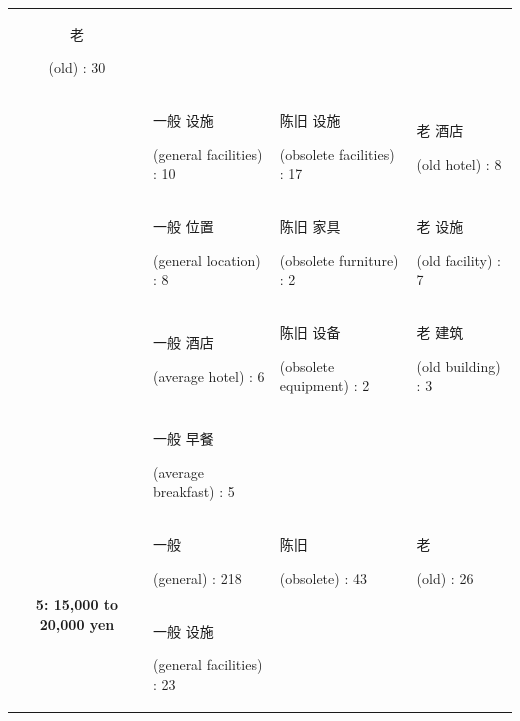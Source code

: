\documentclass[smallextended,natbib]{svjour3}       %
\begin{document}
\begin{landscape}
\begin{table}[p]
{\begin{tabular}{|c|l|l|l|}
          \begin{CJK}{UTF8}{gbsn}老\end{CJK} (old) : 30 \\
         &
          \begin{CJK}{UTF8}{gbsn}一般 设施\end{CJK} (general facilities) : 10 &
          \begin{CJK}{UTF8}{gbsn}陈旧 设施\end{CJK} (obsolete facilities) : 17 &
          \begin{CJK}{UTF8}{gbsn}老 酒店\end{CJK} (old hotel) : 8 \\
         &
          \begin{CJK}{UTF8}{gbsn}一般 位置\end{CJK} (general location) : 8 &
          \begin{CJK}{UTF8}{gbsn}陈旧 家具\end{CJK} (obsolete furniture) : 2 &
          \begin{CJK}{UTF8}{gbsn}老 设施\end{CJK} (old facility) : 7 \\
         &
          \begin{CJK}{UTF8}{gbsn}一般 酒店\end{CJK} (average hotel) : 6 &
          \begin{CJK}{UTF8}{gbsn}陈旧 设备\end{CJK} (obsolete equipment) : 2 &
          \begin{CJK}{UTF8}{gbsn}老 建筑\end{CJK} (old building) : 3 \\
         &
          \begin{CJK}{UTF8}{gbsn}一般 早餐\end{CJK} (average breakfast) : 5 &
           &
           \\ \hline
        \multirow{5}{*}{\textbf{5: 15,000 to 20,000 yen}} &
          \begin{CJK}{UTF8}{gbsn}一般\end{CJK} (general) : 218 &
          \begin{CJK}{UTF8}{gbsn}陈旧\end{CJK} (obsolete) : 43 &
          \begin{CJK}{UTF8}{gbsn}老\end{CJK} (old) : 26 \\
         &
          \begin{CJK}{UTF8}{gbsn}一般 设施\end{CJK} (general facilities) : 23 &

\end{tabular}}
\end{table}
\end{landscape}
\end{document}
